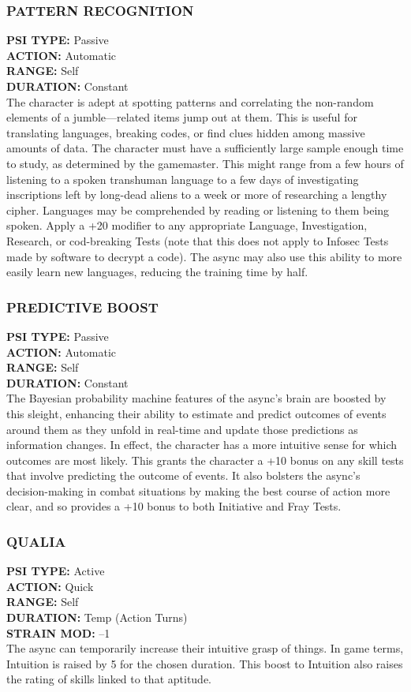 \subsubsection{PATTERN RECOGNITION}
\textbf{PSI TYPE:} Passive \\ 
\textbf{ACTION:} Automatic \\ 
\textbf{RANGE:} Self \\ 
\textbf{DURATION:} Constant \\
The character is adept at spotting patterns and correlating
the non-random elements of a jumble—related
items jump out at them. This is useful for translating
languages, breaking codes, or find clues hidden among
massive amounts of data. The character must have
a sufficiently large sample enough time to study, as
determined by the gamemaster. This might range from
a few hours of listening to a spoken transhuman language
to a few days of investigating inscriptions left
by long-dead aliens to a week or more of researching
a lengthy cipher. Languages may be comprehended by
reading or listening to them being spoken. Apply a
+20 modifier to any appropriate Language, Investigation,
Research, or cod-breaking Tests (note that this
does not apply to Infosec Tests made by software to
decrypt a code). The async may also use this ability to
more easily learn new languages, reducing the training
time by half.

\subsubsection{PREDICTIVE BOOST}
\textbf{PSI TYPE:} Passive \\ 
\textbf{ACTION:} Automatic \\ 
\textbf{RANGE:} Self \\ 
\textbf{DURATION:} Constant \\
The Bayesian probability machine features of the
async’s brain are boosted by this sleight, enhancing
their ability to estimate and predict outcomes of
events around them as they unfold in real-time and
update those predictions as information changes.
In effect, the character has a more intuitive sense
for which outcomes are most likely. This grants the
character a +10 bonus on any skill tests that involve
predicting the outcome of events. It also bolsters
the async’s decision-making in combat situations by
making the best course of action more clear, and so
provides a +10 bonus to both Initiative and Fray Tests.

\subsubsection{QUALIA}
\textbf{PSI TYPE:} Active \\ 
\textbf{ACTION:} Quick \\ 
\textbf{RANGE:} Self \\ 
\textbf{DURATION:} Temp (Action Turns) \\
\textbf{STRAIN MOD:} –1 \\
The async can temporarily increase their intuitive
grasp of things. In game terms, Intuition is raised by
5 for the chosen duration. This boost to Intuition also
raises the rating of skills linked to that aptitude.

